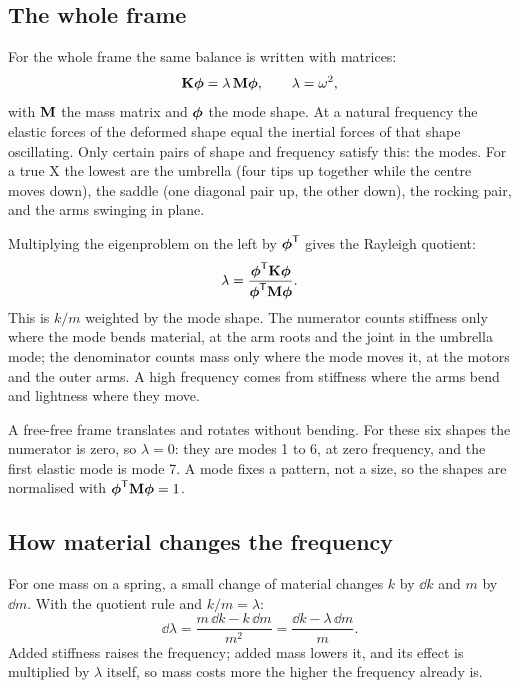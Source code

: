 \subsection{The whole frame}

For the whole frame the same balance is written with matrices:
\begin{equation}
\mathbf{K}\boldsymbol{\phi} = \lambda\,\mathbf{M}\boldsymbol{\phi}, \qquad \lambda = \omega^2,
\end{equation}
with $\mathbf{M}$ the mass matrix and $\boldsymbol{\phi}$ the mode shape. At a natural frequency the elastic forces of the deformed shape equal the inertial forces of that shape oscillating. Only certain pairs of shape and frequency satisfy this: the modes. For a true X the lowest are the umbrella (four tips up together while the centre moves down), the saddle (one diagonal pair up, the other down), the rocking pair, and the arms swinging in plane.

Multiplying the eigenproblem on the left by $\boldsymbol{\phi}^{\mathsf{T}}$ gives the Rayleigh quotient:
\begin{equation}
\lambda = \frac{\boldsymbol{\phi}^{\mathsf{T}}\mathbf{K}\boldsymbol{\phi}}{\boldsymbol{\phi}^{\mathsf{T}}\mathbf{M}\boldsymbol{\phi}}.
\end{equation}
This is $k/m$ weighted by the mode shape. The numerator counts stiffness only where the mode bends material, at the arm roots and the joint in the umbrella mode; the denominator counts mass only where the mode moves it, at the motors and the outer arms. A high frequency comes from stiffness where the arms bend and lightness where they move.

A free-free frame translates and rotates without bending. For these six shapes the numerator is zero, so $\lambda = 0$: they are modes 1 to 6, at zero frequency, and the first elastic mode is mode 7. A mode fixes a pattern, not a size, so the shapes are normalised with $\boldsymbol{\phi}^{\mathsf{T}}\mathbf{M}\boldsymbol{\phi} = 1$.

\subsection{How material changes the frequency}

For one mass on a spring, a small change of material changes $k$ by $\dd k$ and $m$ by $\dd m$. With the quotient rule and $k/m = \lambda$:
\begin{equation}
\dd\lambda = \frac{m\,\dd k - k\,\dd m}{m^2} = \frac{\dd k - \lambda\,\dd m}{m}.
\end{equation}
Added stiffness raises the frequency; added mass lowers it, and its effect is multiplied by $\lambda$ itself, so mass costs more the higher the frequency already is.

